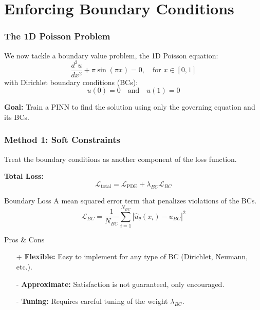 \documentclass[notes]{beamer}
\begin{document}
\section{Enforcing Boundary Conditions}

\begin{frame}
\frametitle{The 1D Poisson Problem}

We now tackle a boundary value problem, the 1D Poisson equation:
\begin{equation*}
\frac{d^2u}{dx^2} + \pi \sin(\pi x) = 0, \quad \text{for } x \in [0, 1]
\end{equation*}
with Dirichlet boundary conditions (BCs):
\begin{equation*}
u(0) = 0 \quad \text{and} \quad u(1) = 0
\end{equation*}

\textbf{Goal:} Train a PINN to find the solution using only the governing equation and its BCs.

\vspace{1cm}
\centering
\href{https://colab.research.google.com/github/kks32-courses/ut-portugal-sciml/blob/main/docs/01-pinn/poisson.ipynb}{}

\end{frame}

\begin{frame}
\frametitle{Method 1: Soft Constraints}

Treat the boundary conditions as another component of the loss function.

\textbf{Total Loss:}
\begin{equation*}
\mathcal{L}_{\text{total}} = \mathcal{L}_{\text{PDE}} + \lambda_{BC} \mathcal{L}_{BC}
\end{equation*}

\begin{block}{Boundary Loss}
A mean squared error term that penalizes violations of the BCs.
\begin{equation*}
\mathcal{L}_{BC} = \frac{1}{N_{BC}} \sum_{i=1}^{N_{BC}} |\hat{u}_\theta(x_i) - u_{BC}|^2
\end{equation*}
\end{block}

\begin{alertblock}{Pros \& Cons}
\begin{itemize}
    \item[+]\textbf{Flexible:} Easy to implement for any type of BC (Dirichlet, Neumann, etc.).
    \item[-]\textbf{Approximate:} Satisfaction is not guaranteed, only encouraged.
    \item[-]\textbf{Tuning:} Requires careful tuning of the weight $\lambda_{BC}$.
\end{itemize}
\end{alertblock}

\end{frame}
\end{document}
